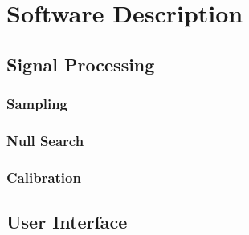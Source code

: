 \section{Software Description}
\subsection{Signal Processing}
\subsubsection{Sampling}
\subsubsection{Null Search}
\subsubsection{Calibration}
\subsection{User Interface}
